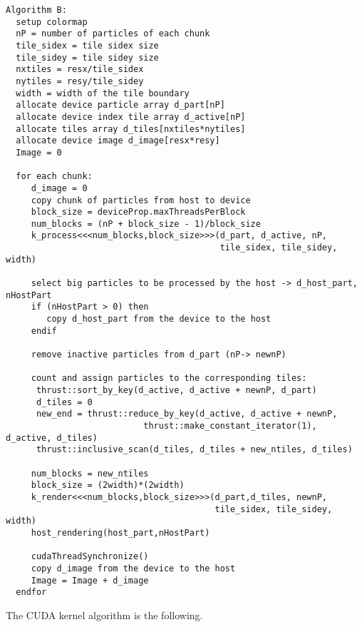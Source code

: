 \documentclass[11pt]{article}
\begin{document}
\small
\begin{verbatim}
Algorithm B:
  setup colormap
  nP = number of particles of each chunk
  tile_sidex = tile sidex size 
  tile_sidey = tile sidey size
  nxtiles = resx/tile_sidex
  nytiles = resy/tile_sidey
  width = width of the tile boundary
  allocate device particle array d_part[nP]
  allocate device index tile array d_active[nP]
  allocate tiles array d_tiles[nxtiles*nytiles]   
  allocate device image d_image[resx*resy]
  Image = 0
 
  for each chunk: 
     d_image = 0
     copy chunk of particles from host to device  
     block_size = deviceProp.maxThreadsPerBlock
     num_blocks = (nP + block_size - 1)/block_size
     k_process<<<num_blocks,block_size>>>(d_part, d_active, nP, 
                                          tile_sidex, tile_sidey, width)

     select big particles to be processed by the host -> d_host_part, nHostPart
     if (nHostPart > 0) then
        copy d_host_part from the device to the host 
     endif
 
     remove inactive particles from d_part (nP-> newnP) 

     count and assign particles to the corresponding tiles:
      thrust::sort_by_key(d_active, d_active + newnP, d_part)
      d_tiles = 0
      new_end = thrust::reduce_by_key(d_active, d_active + newnP, 
                           thrust::make_constant_iterator(1), d_active, d_tiles)
      thrust::inclusive_scan(d_tiles, d_tiles + new_ntiles, d_tiles)

     num_blocks = new_ntiles
     block_size = (2width)*(2width) 
     k_render<<<num_blocks,block_size>>>(d_part,d_tiles, newnP, 
                                         tile_sidex, tile_sidey, width)
     host_rendering(host_part,nHostPart)  

     cudaThreadSynchronize()
     copy d_image from the device to the host
     Image = Image + d_image
  endfor

\end{verbatim}
\normalsize
The CUDA kernel algorithm is the following. 
\small
\end{document}
